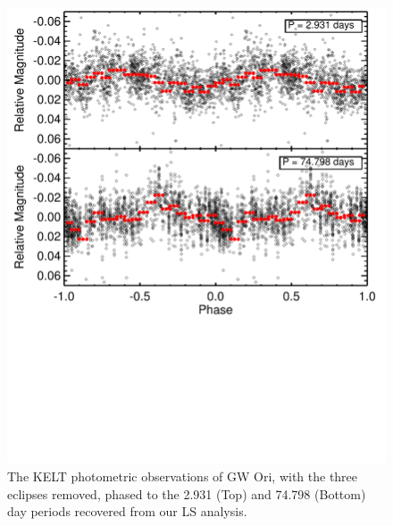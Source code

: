 \documentclass[twocolumn]{aastex61}
\begin{document}
\begin{figure}[!ht]
\centering\includegraphics[width=0.99\linewidth, trim = 0 3.5in 0 0]{Figure_Phased.pdf}
\caption{The KELT photometric observations of GW Ori, with the three eclipses removed, phased to the 2.931 (Top) and 74.798 (Bottom) day periods recovered from our LS analysis. }%
\label{fig:phased}
\end{figure}
\end{document}
